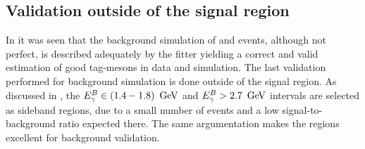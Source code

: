 \subsection{Validation outside of the \texorpdfstring{\EB}{EB} signal region}\label{sec:sidebands_validation}

In  it was seen that the background simulation of \qqbar and \BB events,
although not perfect, is described adequately by the \Mbc fitter yielding a correct and valid estimation of good tag-\B mesons in data and simulation.
The last validation performed for background simulation is done outside of the \EB signal region.
As discussed in , the ${E^B_{\gamma}}\in(1.4-1.8)~\mathrm{\,Ge\kern -0.1em V}$ and ${E^B_{\gamma}}>2.7~\mathrm{\,Ge\kern -0.1em V}$ intervals are selected as sideband regions, 
due to a small number of \BtoXsgamma events and a low signal-to-background ratio expected there.
The same argumentation makes the regions excellent for background validation.

